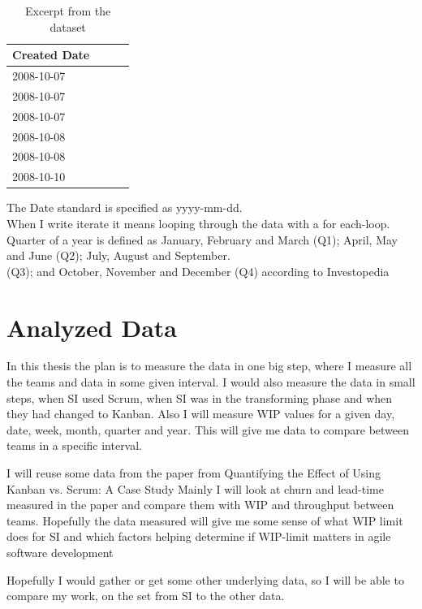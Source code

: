 \documentclass[UKenglish]{ifimaster}  %
\begin{document}
\begin{table}[ht]
\begin{center}
    \begin{tabular}{| l | l | l | l |}
    \hline
    Created Date\\ \hline
    2008-10-07\\ \hline
    2008-10-07 \\ \hline
    2008-10-07 \\ \hline
    2008-10-08\\ \hline
    2008-10-08\\ \hline
   2008-10-10\\ \hline
    \end{tabular}
\caption{Excerpt from the dataset}
\label{dataset} %
\end{center}
\end{table}

The Date standard is specified as yyyy-mm-dd. \\
When I write iterate it means looping through the data with a for each-loop. \\
Quarter of a year is defined as January, February and March (Q1); April, May and June (Q2); July, August and September.\\ (Q3); and October, November and December (Q4) according to Investopedia \parencite{Quarter}

\section{Analyzed Data}
In this thesis the plan is to measure the data in one big step, where I measure all the teams and data in some given interval. I would also measure the data in small steps, when SI used Scrum, when SI was in the transforming phase and when they had changed to Kanban. Also I will measure WIP values for a given day, date, week, month, quarter and year. This will give me data to compare between teams in a specific interval.

I will reuse some data from the paper from Quantifying the Effect of Using Kanban vs. Scrum: A Case Study \parencite{Dag} Mainly I will look at churn and lead-time measured in the paper and compare them with WIP and throughput between teams. Hopefully the data measured will give me some sense of what WIP limit does for SI and which factors helping determine if WIP-limit matters in agile software development

Hopefully I would gather or get some other underlying data, so I will be able to compare my work, on the set from SI to the other data.
\end{document}
